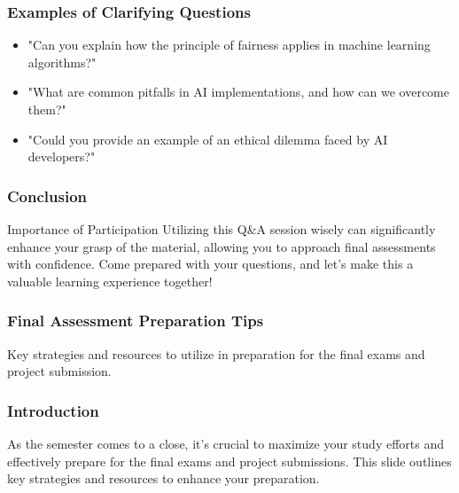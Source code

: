\documentclass[aspectratio=169]{beamer}
\begin{document}
\begin{frame}[fragile]
  \frametitle{Examples of Clarifying Questions}
  \begin{itemize}
    \item "Can you explain how the principle of fairness applies in machine learning algorithms?"
    \item "What are common pitfalls in AI implementations, and how can we overcome them?"
    \item "Could you provide an example of an ethical dilemma faced by AI developers?"
  \end{itemize}
\end{frame}

\begin{frame}[fragile]
  \frametitle{Conclusion}
  \begin{block}{Importance of Participation}
    Utilizing this Q\&A session wisely can significantly enhance your grasp of the material, allowing you to approach final assessments with confidence. Come prepared with your questions, and let's make this a valuable learning experience together!
  \end{block}
\end{frame}

\begin{frame}[fragile]
    \frametitle{Final Assessment Preparation Tips}
    Key strategies and resources to utilize in preparation for the final exams and project submission.
\end{frame}

\begin{frame}[fragile]
    \frametitle{Introduction}
    As the semester comes to a close, it's crucial to maximize your study efforts and effectively prepare for the final exams and project submissions. 
    This slide outlines key strategies and resources to enhance your preparation.
\end{frame}
\end{document}
